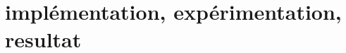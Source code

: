\chapter[implémentation, expérimentation, resultat]{implémentation, expérimentation, resultat} %
\label{chapter_degree_aware_scheduling} %
